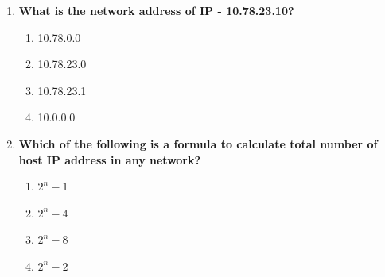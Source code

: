 \begin{flushleft}
\begin{enumerate}
		\item \textbf{What is the network address of IP - 10.78.23.10?}
		\begin{enumerate}[label=(\alph*)]
			\item 10.78.0.0
			\item 10.78.23.0
			\item 10.78.23.1     
			\item 10.0.0.0    %
		\end{enumerate}
		\bigskip
		\bigskip		

		\item \textbf{Which of the following is a formula to calculate total number of host IP address in any network?}
		\begin{enumerate}[label=(\alph*)]
			\item $2^n-1$
			\item $2^n-4$
			\item $2^n-8$
			\item $2^n-2$   %
		\end{enumerate}
		\bigskip
		\bigskip		

		
		
	\end{enumerate}
\end{flushleft}

\newpage

